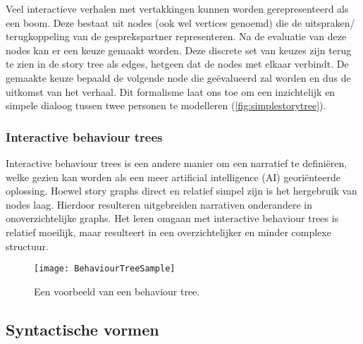 Veel interactieve verhalen met vertakkingen kunnen worden gerepresenteerd als een boom\cite{GalyeanIII1995}. Deze bestaat uit nodes (ook wel vertices genoemd) die de uitspraken/ terugkoppeling van de gesprekspartner representeren. Na de evaluatie van deze nodes kan er een keuze gemaakt worden. Deze discrete set van keuzes zijn terug te zien in de story tree als edges, hetgeen dat de nodes met elkaar verbindt. De gemaakte keuze bepaald de volgende node die geëvalueerd zal worden en dus de uitkomst van het verhaal. Dit formalisme laat ons toe om een inzichtelijk en simpele dialoog tussen twee personen te modelleren (\autoref{fig:simplestorytree}).

\subsubsection{Interactive behaviour trees}


Interactive behaviour trees is een andere manier om een narratief te definiëren, welke gezien kan worden als een meer artificial intelligence (AI) georiënteerde oplossing. Hoewel story graphs direct en relatief simpel zijn is het hergebruik van nodes laag. Hierdoor resulteren uitgebreiden narrativen onderandere in onoverzichtelijke graphs. Het leren omgaan met interactive behaviour trees is relatief moeilijk, maar resulteert in een overzichtelijker en minder complexe structuur\cite{Kapadia2015}. 

\begin{figure}[htb]
    \centering
    \texttt{[image: BehaviourTreeSample]}
    \caption[]{Een voorbeeld van een behaviour tree. \footnotemark}
    \label{fig:behaviourtreesample}
\end{figure}

\subsection{Syntactische vormen}

